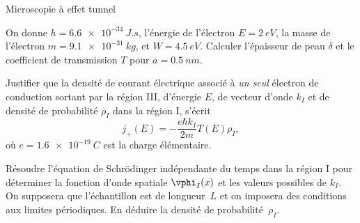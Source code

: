 \begin{exo}[PC][3][TD]{Microscopie à effet tunnel}
\begin{quest}
\item 
On donne  $h=\SI{6,6e-34}{J.s}$, l'énergie de l'électron $E=\SI{2}{eV}$, la masse de l'électron $m=\SI{9,1e-31}{kg}$, et $W=\SI{4.5}{eV}$. Calculer l'épaisseur de peau $\delta$ et le coefficient de transmission $T$ pour $a=\SI{0,5}{nm}$. 
\end{quest}
\begin{quest}
\item Justifier que la densité de courant électrique associé à \emph{un seul} électron de conduction sortant par la région III, d'énergie $E$, de vecteur d'onde $k_I$  et de densité de probabilité $\rho_I$ dans la région I, s'écrit  
\begin{equation*}
j_+(E) = -\frac{e\hbar k_I}{2m} T(E) \rho_I,
\end{equation*}
où $e=\SI{1,6e-19}{C}$ est la charge élémentaire.
\item Résoudre l'équation de Schrödinger indépendante du temps dans la région I pour déterminer la fonction d'onde spatiale $\vphi_I(x)$ et les valeurs possibles de $k_I$. On supposera que l'échantillon est de longueur~$L$ et on imposera des conditions aux limites périodiques. En déduire la densité de probabilité~$\rho_I$.

\end{quest}
\end{exo}
